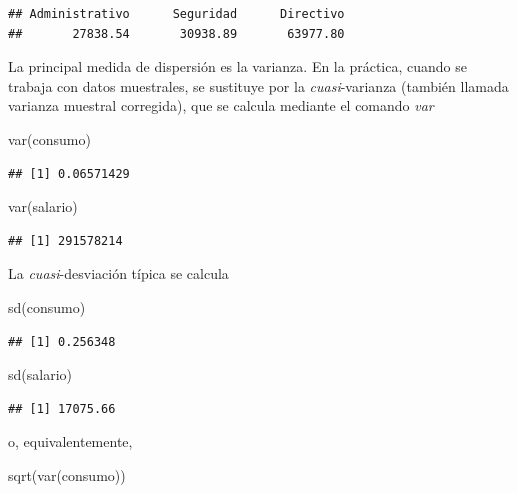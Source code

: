 \documentclass[
]{book}
\newenvironment{Shaded}{\begin{snugshade}}{\end{snugshade}}
\newcommand{\FunctionTok}[1]{\textcolor[rgb]{0.00,0.00,0.00}{#1}}
\newcommand{\NormalTok}[1]{#1}
\theoremstyle{break}
\theoremstyle{nonumberplain}
\begin{document}
\begin{verbatim}
## Administrativo      Seguridad      Directivo 
##       27838.54       30938.89       63977.80
\end{verbatim}

La principal medida de dispersión es la varianza. En la práctica, cuando
se trabaja con datos muestrales, se sustituye por la \emph{cuasi}-varianza
(también llamada varianza muestral corregida), que se calcula mediante
el comando \emph{var}

\begin{Shaded}
\begin{Highlighting}[]
\FunctionTok{var}\NormalTok{(consumo)}
\end{Highlighting}
\end{Shaded}

\begin{verbatim}
## [1] 0.06571429
\end{verbatim}

\begin{Shaded}
\begin{Highlighting}[]
\FunctionTok{var}\NormalTok{(salario)}
\end{Highlighting}
\end{Shaded}

\begin{verbatim}
## [1] 291578214
\end{verbatim}

La \emph{cuasi}-desviación típica se calcula

\begin{Shaded}
\begin{Highlighting}[]
\FunctionTok{sd}\NormalTok{(consumo)}
\end{Highlighting}
\end{Shaded}

\begin{verbatim}
## [1] 0.256348
\end{verbatim}

\begin{Shaded}
\begin{Highlighting}[]
\FunctionTok{sd}\NormalTok{(salario)}
\end{Highlighting}
\end{Shaded}

\begin{verbatim}
## [1] 17075.66
\end{verbatim}

o, equivalentemente,

\begin{Shaded}
\begin{Highlighting}[]
\FunctionTok{sqrt}\NormalTok{(}\FunctionTok{var}\NormalTok{(consumo))}
\end{Highlighting}
\end{Shaded}
\end{document}
